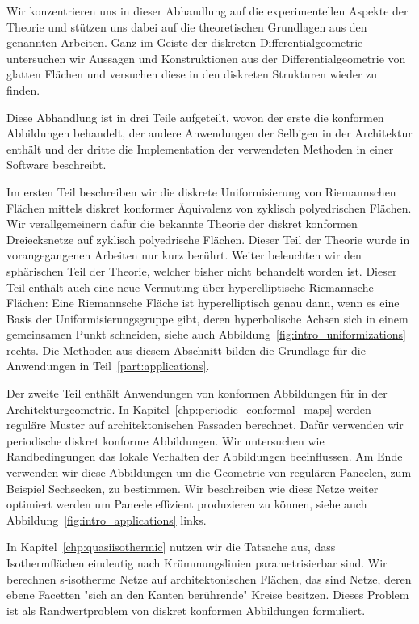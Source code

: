\documentclass[Thesis.tex]{subfiles}
\begin{document}
Wir konzentrieren uns in dieser Abhandlung auf die experimentellen Aspekte der Theorie und st\"{u}tzen uns dabei auf die theoretischen Grundlagen aus den genannten Arbeiten.
Ganz im Geiste der diskreten Differentialgeometrie untersuchen wir Aussagen und Konstruktionen aus der Differentialgeometrie von glatten Fl\"{a}chen und versuchen diese in den diskreten Strukturen wieder zu finden.

Diese Abhandlung ist in drei Teile aufgeteilt, wovon der erste die konformen Abbildungen behandelt, der andere Anwendungen der Selbigen in der Architektur enth\"{a}lt und der dritte die Implementation der verwendeten Methoden in einer Software beschreibt.

Im ersten Teil beschreiben wir die diskrete Uniformisierung von Riemannschen Fl\"{a}chen mittels diskret konformer \"{A}quivalenz von zyklisch polyedrischen Fl\"{a}chen.
Wir verallgemeinern daf\"{u}r die bekannte Theorie der diskret konformen Dreiecksnetze auf zyklisch polyedrische Fl\"{a}chen.
Dieser Teil der Theorie wurde in vorangegangenen Arbeiten nur kurz ber\"{u}hrt.
Weiter beleuchten wir den sph\"{a}rischen Teil der Theorie, welcher bisher nicht behandelt worden ist.
Dieser Teil enth\"{a}lt auch eine neue Vermutung \"{u}ber hyperelliptische Riemannsche Fl\"{a}chen: 
Eine Riemannsche Fl\"{a}che ist hyperelliptisch genau dann, wenn es eine Basis der Uniformisierungsgruppe gibt, deren hyperbolische Achsen sich in einem gemeinsamen Punkt schneiden, siehe auch Abbildung~\ref{fig:intro_uniformizations} rechts.
Die Methoden aus diesem Abschnitt bilden die Grundlage f\"{u}r die Anwendungen in Teil~\ref{part:applications}.

Der zweite Teil enth\"{a}lt Anwendungen von konformen Abbildungen f\"{u}r in der Architekturgeometrie.
In Kapitel~\ref{chp:periodic_conformal_maps} werden regul\"{a}re Muster auf architektonischen Fassaden berechnet.
Daf\"{u}r verwenden wir periodische diskret konforme Abbildungen.
Wir untersuchen wie Randbedingungen das lokale Verhalten der Abbildungen beeinflussen.
Am Ende verwenden wir diese Abbildungen um die Geometrie von regul\"{a}ren Paneelen, zum Beispiel Sechsecken, zu bestimmen. 
Wir beschreiben wie diese Netze weiter optimiert werden um Paneele effizient produzieren zu k\"{o}nnen, siehe auch Abbildung~\ref{fig:intro_applications} links.

In Kapitel~\ref{chp:quasiisothermic} nutzen wir die Tatsache aus, dass Isothermfl\"{a}chen eindeutig nach Kr\"{u}mmungslinien parametrisierbar sind.
Wir berechnen s-isotherme Netze auf architektonischen Fl\"{a}chen, das sind Netze, deren ebene Facetten "sich an den Kanten ber\"{u}hrende" Kreise besitzen.
Dieses Problem ist als Randwertproblem von diskret konformen Abbildungen formuliert.
\end{document}
